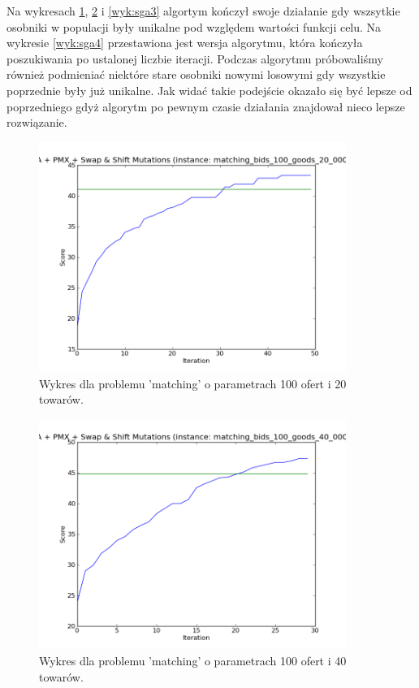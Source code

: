 Na wykresach \ref{wyk:sga1}, \ref{wyk:sga2} i \ref{wyk:sga3} algortym kończył swoje działanie gdy wszsytkie osobniki w populacji były unikalne pod względem wartości funkcji celu.
Na wykresie \ref{wyk:sga4} przestawiona jest wersja algorytmu, która kończyła poszukiwania  po ustalonej liczbie iteracji.
Podczas algorytmu próbowaliśmy również podmieniać niektóre stare osobniki nowymi losowymi gdy wszystkie poprzednie były już unikalne.
Jak widać takie podejście okazało się być lepsze od poprzedniego gdyż algorytm po pewnym czasie działania znajdował nieco lepsze rozwiązanie.


\begin{figure}[!ht]
    \centering
    \includegraphics[width=10cm]{wykresy/matching_bids_100_goods_20_0000_txt_1.png}
    \caption{Wykres dla problemu 'matching' o parametrach 100 ofert i 20 towarów.}
    \label{wyk:sga1}
\end{figure}

\begin{figure}[!ht]
    \centering
    \includegraphics[width=10cm]{wykresy/matching_bids_100_goods_40_0000_txt_3.png}
    \caption{Wykres dla problemu 'matching' o parametrach 100 ofert i 40 towarów.}
    \label{wyk:sga2}
\end{figure}

